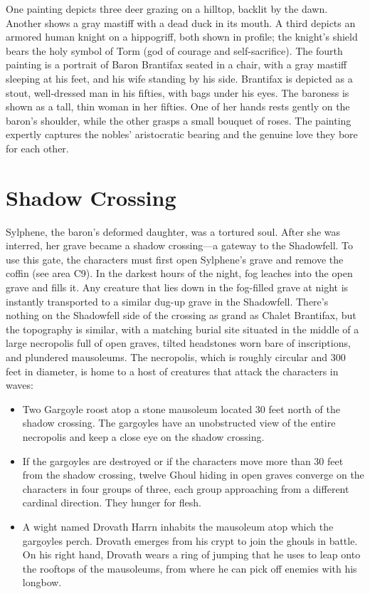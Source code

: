 \documentclass[10pt,a4paper,twoside,bg=print,twocolumn,openany,nodeprecatedcode]{dndbook}
\begin{document}
One painting depicts three deer grazing on a hilltop, backlit by the dawn. Another shows a gray mastiff with a dead duck in its mouth. A third depicts an armored human knight on a hippogriff, both shown in profile; the knight's shield bears the holy symbol of Torm (god of courage and self-sacrifice). The fourth painting is a portrait of Baron Brantifax seated in a chair, with a gray mastiff sleeping at his feet, and his wife standing by his side. Brantifax is depicted as a stout, well-dressed man in his fifties, with bags under his eyes. The baroness is shown as a tall, thin woman in her fifties. One of her hands rests gently on the baron's shoulder, while the other grasps a small bouquet of roses. The painting expertly captures the nobles' aristocratic bearing and the genuine love they bore for each other.

\section{Shadow Crossing}
Sylphene, the baron's deformed daughter, was a tortured soul. After she was interred, her grave became a shadow crossing—a gateway to the Shadowfell. To use this gate, the characters must first open Sylphene's grave and remove the coffin (see area C9). In the darkest hours of the night, fog leaches into the open grave and fills it. Any creature that lies down in the fog-filled grave at night is instantly transported to a similar dug-up grave in the Shadowfell. There's nothing on the Shadowfell side of the crossing as grand as Chalet Brantifax, but the topography is similar, with a matching burial site situated in the middle of a large necropolis full of open graves, tilted headstones worn bare of inscriptions, and plundered mausoleums. The necropolis, which is roughly circular and 300 feet in diameter, is home to a host of creatures that attack the characters in waves:


\begin{itemize}
\item Two Gargoyle roost atop a stone mausoleum located 30 feet north of the shadow crossing. The gargoyles have an unobstructed view of the entire necropolis and keep a close eye on the shadow crossing.
\item If the gargoyles are destroyed or if the characters move more than 30 feet from the shadow crossing, twelve Ghoul hiding in open graves converge on the characters in four groups of three, each group approaching from a different cardinal direction. They hunger for flesh.
\item A wight named Drovath Harrn inhabits the mausoleum atop which the gargoyles perch. Drovath emerges from his crypt to join the ghouls in battle. On his right hand, Drovath wears a ring of jumping that he uses to leap onto the rooftops of the mausoleums, from where he can pick off enemies with his longbow.
\end{itemize}
\end{document}
